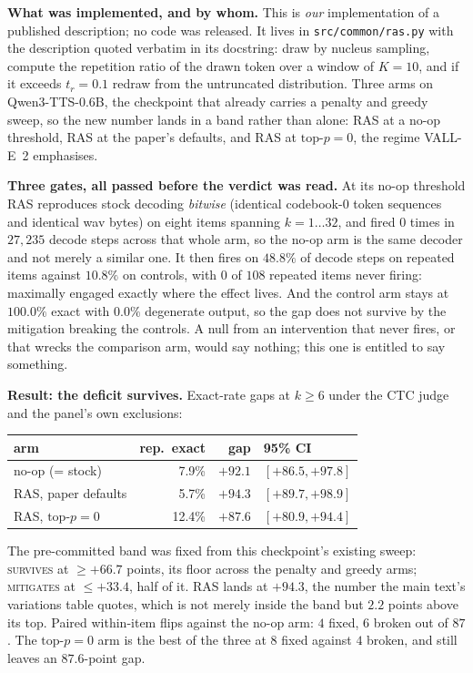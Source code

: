 \documentclass[11pt]{article}
\begin{document}
\textbf{What was implemented, and by whom.} This is \emph{our} implementation of
a published description; no code was released. It lives in
\texttt{src/common/ras.py} with the description quoted verbatim in its docstring:
draw by nucleus sampling, compute the repetition ratio of the drawn token over a
window of $K{=}10$, and if it exceeds $t_r{=}0.1$ redraw from the untruncated
distribution. Three arms on Qwen3-TTS-0.6B, the checkpoint that already
carries a penalty and greedy sweep, so the new number lands in a band rather than
alone: RAS at a no-op threshold, RAS at the paper's defaults, and RAS at
$\text{top-}p{=}0$, the regime VALL-E~2 emphasises.

\textbf{Three gates, all passed before the verdict was read.} At its no-op
threshold RAS reproduces stock decoding \emph{bitwise} (identical codebook-0
token sequences and identical wav bytes) on eight items spanning
$k{=}1\ldots32$, and fired $0$ times in $27{,}235$ decode steps across that whole
arm, so the no-op arm is the same decoder and not merely a similar one. It then
fires on $48.8\%$ of decode steps on repeated items against $10.8\%$ on controls,
with $0$ of $108$ repeated items never firing: maximally engaged exactly where
the effect lives. And the control arm stays at $100.0\%$ exact with $0.0\%$
degenerate output, so the gap does not survive by the mitigation breaking the
controls. A null from an intervention that never fires, or that wrecks the
comparison arm, would say nothing; this one is entitled to say something.

\textbf{Result: the deficit survives.} Exact-rate gaps at $k\ge6$ under the CTC
judge and the panel's own exclusions:

\begin{center}
\begin{tabular}{@{}lrrl@{}}
\toprule
arm & rep.\ exact & gap & 95\% CI \\
\midrule
no-op (= stock)          & 7.9\%  & $+92.1$ & $[+86.5, +97.8]$ \\
RAS, paper defaults      & 5.7\%  & $+94.3$ & $[+89.7, +98.9]$ \\
RAS, $\text{top-}p{=}0$  & 12.4\% & $+87.6$ & $[+80.9, +94.4]$ \\
\bottomrule
\end{tabular}
\end{center}

\noindent The pre-committed band was fixed from this checkpoint's existing sweep:
\textsc{survives} at $\ge +66.7$ points, its floor across the penalty and greedy
arms; \textsc{mitigates} at $\le +33.4$, half of it. RAS lands at $+94.3$, the
number the main text's variations table quotes, which
is not merely inside the band but $2.2$ points above its top. Paired within-item
flips against the no-op arm: $4$ fixed, $6$ broken out of $87$. The
$\text{top-}p{=}0$ arm is the best of the three at $8$ fixed against $4$ broken,
and still leaves an $87.6$-point gap.
\end{document}
